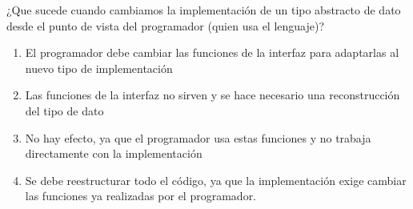 {
¿Que sucede cuando cambiamos la implementación de un tipo abstracto de dato desde el punto de vista del programador (quien usa el lenguaje)?

\begin{enumerate}
\item El programador debe cambiar las funciones de la interfaz para adaptarlas al nuevo tipo de implementación
\item Las funciones de la interfaz no sirven y se hace necesario una reconstrucción del tipo de dato
\item No hay efecto, ya que el programador usa estas funciones y no trabaja directamente con la implementación %
\item Se debe reestructurar todo el código, ya que la implementación exige cambiar las funciones ya realizadas por el programador.
\end{enumerate}
}
